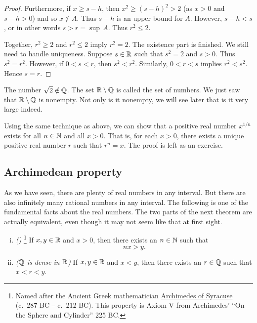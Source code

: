 \begin{example}
\begin{proof}
Furthermore, if $x \geq s-h$,
then $x^2 \geq {(s-h)}^2 > 2$ (as $x > 0$ and $s-h > 0$) and so $x \notin A$.
Thus
$s-h$ is an upper bound for $A$.  However, $s-h < s$,  or in other
words $s > r = \sup\, A$.  Thus $r^2 \leq 2$.

\medskip

Together, $r^2 \geq 2$ and $r^2 \leq 2$ imply
$r^2 = 2$.  The existence part is finished.  We still need to
handle uniqueness.  Suppose $s \in {\mathbb{R}}$ such that $s^2 = 2$ and $s > 0$.
Thus $s^2 = r^2$.  However, if $0 < s < r$, then $s^2 < r^2$.  Similarly,
$0 < r < s$ implies $r^2 < s^2$.  Hence $s = r$.
\end{proof}
\end{example}

The number $\sqrt{2} \notin {\mathbb{Q}}$.  The set
${\mathbb{R}} \setminus {\mathbb{Q}}$ is called the set of
\emph{} numbers.  We just saw that ${\mathbb{R}} \setminus {\mathbb{Q}}$
is nonempty.  Not only is it nonempty, we will see later that is it very
large indeed.

Using the same technique as above, we can show that a positive real
number $x^{1/n}$ exists for all $n\in {\mathbb{N}}$ and all $x > 0$.
That is, for each $x > 0$,
there exists a unique positive real number $r$ such that $r^n = x$.
The proof is left as an exercise.

\subsection{Archimedean property}

As we have seen, there are plenty of real numbers in any interval.  But
there are also infinitely many rational numbers in any interval.  The
following is one of the fundamental facts about the real numbers.
The two parts of the next theorem are actually equivalent, even though it may
not seem like that at first sight.


\pagebreak[3]
\begin{thm} \label{thm:arch}
\leavevmode
\begin{enumerate}[(i)]
\item \label{thm:arch:i} \emph{()}%
\footnote{Named after the Ancient Greek mathematician
\href{https://en.wikipedia.org/wiki/Archimedes}{Archimedes of Syracuse}
(c.\ 287 BC -- c.\ 212 BC)\@.
This property is Axiom V from Archimedes' ``On the Sphere and Cylinder'' 225
BC\@.}
If $x, y \in {\mathbb{R}}$ and
$x > 0$, then there exists an $n \in {\mathbb{N}}$ such that
\begin{equation*}
nx > y .
\end{equation*}
\item \label{thm:arch:ii} \emph{(${\mathbb{Q}}$ is dense in ${\mathbb{R}}$)} If $x, y \in {\mathbb{R}}$ and
$x < y$, then there exists an $r \in {\mathbb{Q}}$ such that
$x < r < y$.
\end{enumerate}
\end{thm}

